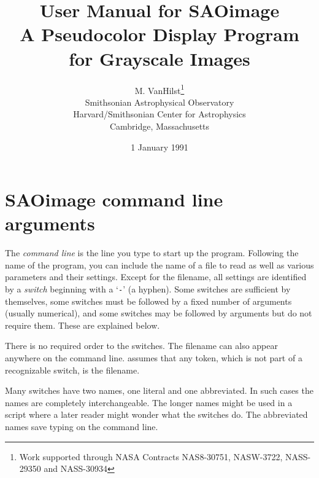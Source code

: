 \setcounter{secnumdepth}{3}
\setcounter{tocdepth}{3}



\begin{titlepage}
\title{\bf User Manual for SAOimage\\[0.2in]
\large\bf A Pseudocolor Display Program for Grayscale Images}
\author{M. VanHilst\thanks{Work supported through NASA Contracts NAS8-30751,
NASW-3722, NASS-29350 and NASS-30934}\\[0.1in]
Smithsonian Astrophysical Observatory\\
Harvard/Smithsonian Center for Astrophysics\\
Cambridge, Massachusetts}
\date{1 January 1991}
\maketitle
\thispagestyle{empty}
\end{titlepage}

\tableofcontents
\cleardoublepage

\section{ SAOimage command line arguments } \label{cmd-sec}

The {\em command line} is the line you type to start up the {\SAO} program.
Following the name of the program, you can include the name
of a file to read as well as various parameters and their settings.
Except for the filename, all settings are identified by a {\em switch}
beginning with a `{\tt -}' (a hyphen).
Some switches are sufficient by themselves, some switches must
be followed by a fixed number of arguments (usually numerical), and
some switches may be followed by arguments but do not require them.
These are explained below.

There is no required order to the switches.  The filename can also
appear anywhere on the command line.
{\SAO} assumes that any token, which is not part of a recognizable
switch, is the filename.

Many switches have two names, one literal and one abbreviated.
In such cases the names are completely interchangeable.
The longer names might be used in a script where a later reader might
wonder what the switches do.
The abbreviated names save typing on the command line.

